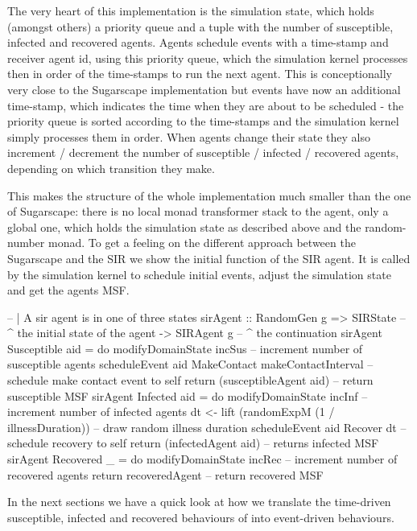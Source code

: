 The very heart of this implementation is the simulation state, which holds (amongst others) a priority queue and a tuple with the number of susceptible, infected and recovered agents. Agents schedule events with a time-stamp and receiver agent id, using this priority queue, which the simulation kernel processes then in order of the time-stamps to run the next agent. This is conceptionally very close to the Sugarscape implementation but events have now an additional time-stamp, which indicates the time when they are about to be scheduled - the priority queue is sorted according to the time-stamps and the simulation kernel simply processes them in order. When agents change their state they also increment / decrement the number of susceptible / infected / recovered agents, depending on which transition they make.

This makes the structure of the whole implementation much smaller than the one of Sugarscape: there is no local monad transformer stack to the agent, only a global one, which holds the simulation state as described above and the random-number monad. To get a feeling on the different approach between the Sugarscape and the SIR we show the initial function of the SIR agent. It is called by the simulation kernel to schedule initial events, adjust the simulation state and get the agents MSF.

\begin{HaskellCode}
-- | A sir agent is in one of three states
sirAgent :: RandomGen g 
         => SIRState    -- ^ the initial state of the agent
         -> SIRAgent g  -- ^ the continuation
sirAgent Susceptible aid = do
    modifyDomainState incSus -- increment number of susceptible agents
    scheduleEvent aid MakeContact makeContactInterval -- schedule make contact event to self
    return (susceptibleAgent aid) -- return susceptible MSF
sirAgent Infected aid = do
    modifyDomainState incInf -- increment number of infected agents
    dt <- lift (randomExpM (1 / illnessDuration)) -- draw random illness duration
    scheduleEvent aid Recover dt -- schedule recovery to self
    return (infectedAgent aid) -- returns infected MSF 
sirAgent Recovered _ = do
    modifyDomainState incRec -- increment number of recovered agents
    return recoveredAgent -- return recovered MSF
\end{HaskellCode}

In the next sections we have a quick look at how we translate the time-driven susceptible, infected and recovered behaviours of into event-driven behaviours.

